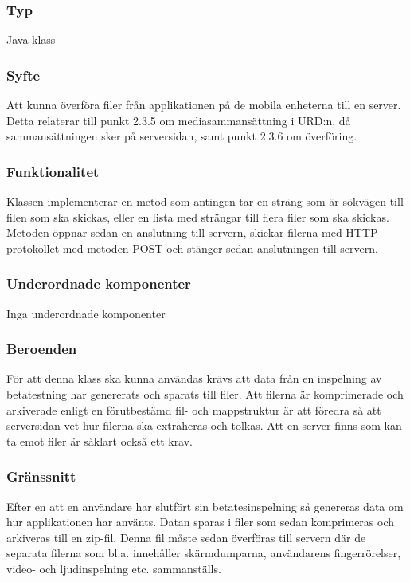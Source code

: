 \subsubsection{Typ}
Java-klass

\subsubsection{Syfte}
Att kunna överföra filer från applikationen på de mobila enheterna till en server. Detta relaterar till punkt 2.3.5 om mediasammansättning i URD:n, då sammansättningen sker på serversidan, samt punkt 2.3.6 om överföring. 

\subsubsection{Funktionalitet}
Klassen implementerar en metod som antingen tar en sträng som är sökvägen till filen som ska skickas, eller en lista med strängar till flera filer som ska skickas. Metoden öppnar sedan en anslutning till servern, skickar filerna med HTTP-protokollet med metoden POST och stänger sedan anslutningen till servern. 

\subsubsection{Underordnade komponenter}
Inga underordnade komponenter

\subsubsection{Beroenden}
För att denna klass ska kunna användas krävs att data från en inspelning av betatestning har genererats och sparats till filer. Att filerna är komprimerade och arkiverade enligt en förutbestämd fil- och mappstruktur är att föredra så att serversidan vet hur filerna ska extraheras och tolkas. Att en server finns som kan ta emot filer är såklart också ett krav. 

\subsubsection{Gränssnitt}
Efter en att en användare har slutfört sin betatesinspelning så genereras data om hur applikationen har använts. Datan sparas i filer som sedan komprimeras och arkiveras till en zip-fil. Denna fil måste sedan överföras till servern där de separata filerna som bl.a. innehåller skärmdumparna, användarens fingerrörelser, video- och ljudinspelning etc. sammanställs. 


